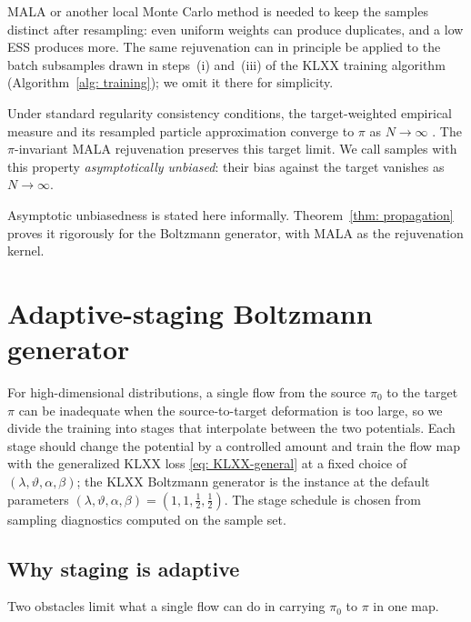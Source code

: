 \documentclass{article}
\begin{document}
\begin{remark}
	MALA or another local Monte Carlo method is needed to keep the samples distinct after resampling: even uniform weights can produce duplicates, and a low ESS produces more. The same rejuvenation can in principle be applied to the batch subsamples drawn in steps~(i) and~(iii) of the KLXX training algorithm (Algorithm~\ref{alg: training}); we omit it there for simplicity.
\end{remark}

Under standard regularity consistency conditions, the target-weighted empirical measure and its resampled particle approximation converge to $\pi$ as $N\to\infty$ \citep{liu2001monte,doucet2001introduction}. The $\pi$-invariant MALA rejuvenation preserves this target limit. We call samples with this property \emph{asymptotically unbiased}: their bias against the target vanishes as $N\to\infty$.

\begin{remark}
Asymptotic unbiasedness is stated here informally. Theorem~\ref{thm: propagation} proves it rigorously for the Boltzmann generator, with MALA as the rejuvenation kernel.
\end{remark}

\section{Adaptive-staging Boltzmann generator}
\label{sec: boltzmann}

For high-dimensional distributions, a single flow from the source $\pi_0$ to the target $\pi$ can be inadequate when the source-to-target deformation is too large, so we divide the training into stages that interpolate between the two potentials. Each stage should change the potential by a controlled amount and train the flow map with the generalized KLXX loss \eqref{eq: KLXX-general} at a fixed choice of $(\lambda,\vartheta,\alpha,\beta)$; the KLXX Boltzmann generator is the instance at the default parameters $(\lambda,\vartheta,\alpha,\beta)=(1,1,\frac12,\frac12)$. The stage schedule is chosen from sampling diagnostics computed on the sample set.

\subsection{Why staging is adaptive}

Two obstacles {\color{blue}limit what} a single flow {\color{blue}can do in} carrying $\pi_0$ to $\pi$ in one map.
\end{document}
